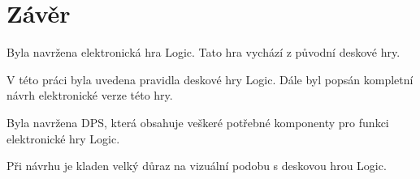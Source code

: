 \chapter*{Závěr}
{}

Byla navržena elektronická hra Logic. Tato hra vychází z původní deskové hry.

V této práci byla uvedena pravidla deskové hry Logic. Dále byl popsán kompletní návrh elektronické verze této hry.

Byla navržena DPS, která obsahuje veškeré potřebné komponenty pro funkci elektronické hry Logic.

Při návrhu je kladen velký důraz na vizuální podobu s deskovou hrou Logic.
